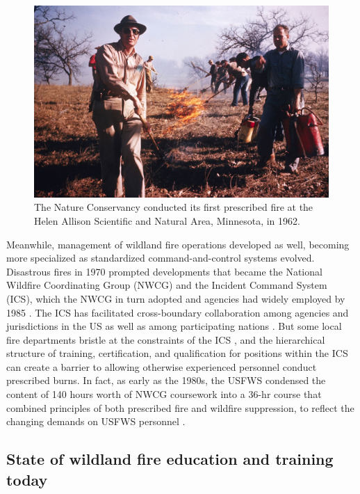 \documentclass[fire,article,submit,moreauthors,pdftex]{Definitions/mdpi}
\begin{document}
\begin{figure}
\centering
\includegraphics[width=1\columnwidth]{TNC_fire.jpg}
\caption{The Nature Conservancy conducted its first prescribed fire at the Helen Allison Scientific and Natural Area, Minnesota, in 1962. \label{TNCfire}}
\end{figure}

Meanwhile, management of wildland fire operations developed as well, becoming more specialized as standardized command-and-control systems evolved.
Disastrous fires in 1970 prompted developments that became the National Wildfire Coordinating Group (NWCG) and the Incident Command System (ICS), which the NWCG in turn adopted and agencies had widely employed by 1985 \citep{dague2015, wilson1978}.
The ICS has facilitated cross-boundary collaboration among agencies and jurisdictions in the US as well as among participating nations \citep{goldammer2004}.
But some local fire departments bristle at the constraints of the ICS \citep{jensen2011}, and the hierarchical structure of training, certification, and qualification for positions within the ICS can create a barrier to allowing otherwise experienced personnel conduct prescribed burns.
In fact, as early as the 1980s, the USFWS condensed the content of 140 hours worth of NWCG coursework into a 36-hr course that combined principles of both prescribed fire and wildfire suppression, to reflect the changing demands on USFWS personnel \citep{murphy1987}.

\subsection{State of wildland fire education and training today}
\end{document}
